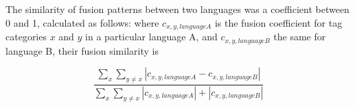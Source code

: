 The similarity of fusion patterns between two languages was a coefficient between 0 and 1, calculated as follows: where $c_{x,y,language A}$ is the fusion coefficient for tag categories $x$ and $y$ in a particular language A, and $c_{x,y,language B}$ the same for language B, their fusion similarity is 

$$\frac{\sum_x\sum_{y \neq x} |c_{x,y,language A} - c_{x,y,language B}|}{\sum_x\sum_{y \neq x} |c_{x,y,language A}| + |c_{x,y,language B}|}$$